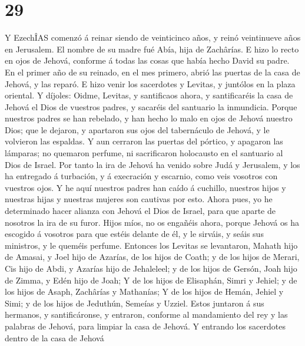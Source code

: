 \hypertarget{section-28}{%
\section{29}\label{section-28}}

 Y EzechÎAS comenzó á reinar siendo de veinticinco años, y
reinó veintinueve años en Jerusalem. El nombre de su madre fué Abía,
hija de Zachârías.  E hizo lo recto en ojos de Jehová,
conforme á todas las cosas que había hecho David su padre.
 En el primer año de su reinado, en el mes primero, abrió
las puertas de la casa de Jehová, y las reparó.  E hizo
venir los sacerdotes y Levitas, y juntólos en la plaza oriental.
 Y díjoles: Oidme, Levitas, y santificaos ahora, y
santificaréis la casa de Jehová el Dios de vuestros padres, y sacaréis
del santuario la inmundicia.  Porque nuestros padres se
han rebelado, y han hecho lo malo en ojos de Jehová nuestro Dios; que le
dejaron, y apartaron sus ojos del tabernáculo de Jehová, y le volvieron
las espaldas.  Y aun cerraron las puertas del pórtico, y
apagaron las lámparas; no quemaron perfume, ni sacrificaron holocausto
en el santuario al Dios de Israel.  Por tanto la ira de
Jehová ha venido sobre Judá y Jerusalem, y los ha entregado á turbación,
y á execración y escarnio, como veis vosotros con vuestros ojos.
 Y he aquí nuestros padres han caído á cuchillo, nuestros
hijos y nuestras hijas y nuestras mujeres son cautivas por esto.
 Ahora pues, yo he determinado hacer alianza con Jehová
el Dios de Israel, para que aparte de nosotros la ira de su furor.
 Hijos míos, no os engañéis ahora, porque Jehová os ha
escogido á vosotros para que estéis delante de él, y le sirváis, y seáis
sus ministros, y le queméis perfume.  Entonces los
Levitas se levantaron, Mahath hijo de Amasai, y Joel hijo de Azarías, de
los hijos de Coath; y de los hijos de Merari, Cis hijo de Abdi, y
Azarías hijo de Jehaleleel; y de los hijos de Gersón, Joah hijo de
Zimma, y Edén hijo de Joah;  Y de los hijos de Elisaphán,
Simri y Jehiel; y de los hijos de Asaph, Zachârías y Mathanías;
 Y de los hijos de Hemán, Jehiel y Simi; y de los hijos
de Jeduthún, Semeías y Uzziel.  Estos juntaron á sus
hermanos, y santificáronse, y entraron, conforme al mandamiento del rey
y las palabras de Jehová, para limpiar la casa de Jehová.
 Y entrando los sacerdotes dentro de la casa de Jehová
